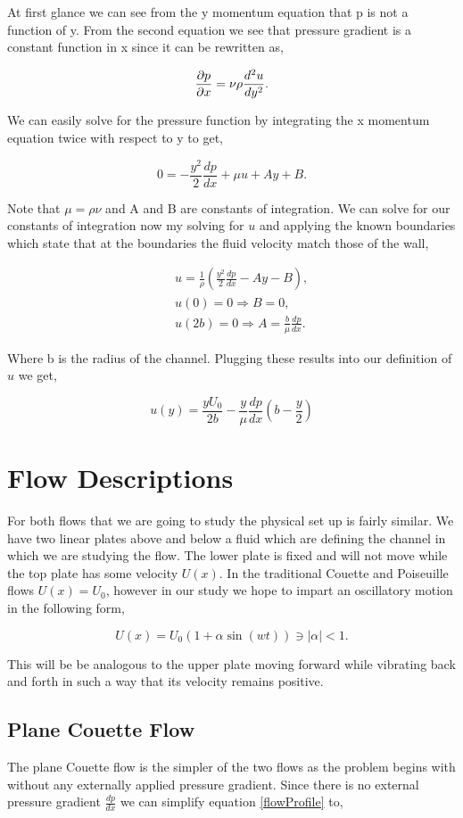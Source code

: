 \documentclass[a4paper,12pt,titlepage]{article}
\begin{document}
At first glance we can see from the y momentum equation that p is not a function of y.  From the second equation we see that pressure gradient is a constant function in x since it can be rewritten as,

\[
\frac{\partial p}{\partial x} = \nu \rho \frac{d^2 u}{dy^2}.
\]

We can easily solve for the pressure function by integrating the x momentum equation twice with respect to y to get,

\[
0 = -\frac{y^2}{2}\frac{dp}{dx} + \mu u + A y + B.
\]

Note that $\mu = \rho \nu$ and A and B are constants of integration.  We can solve for our constants of integration now my solving for $u$ and applying the known boundaries which state that at the boundaries the fluid velocity match those of the wall,

\begin{eqnarray}
&& u = \frac{1}{\rho} \left( \frac{y^2}{2} \frac{dp}{dx} - Ay -B \right),\nonumber \\
&& u(0) = 0 \Rightarrow B = 0, \nonumber \\
&& u(2b) = 0 \Rightarrow A = \frac{b}{\mu} \frac{dp}{dx}.
\end{eqnarray}

Where b is the radius of the channel.  Plugging these results into our definition of $u$ we get,

\[
u(y) = \frac{yU_0}{2b} - \frac{y}{\mu} \frac{dp}{dx}\left(b-\frac{y}{2}\right)
\label{flowProfile}
\]

\section{Flow Descriptions}

For both flows that we are going to study the physical set up is fairly similar.  We have two linear plates above and below a fluid which are defining the channel in which we are studying the flow.  The lower plate is fixed and will not move while the top plate has some velocity $U(x)$.  In the traditional Couette and Poiseuille flows $U(x) = U_0$, however in our study we hope to impart an oscillatory motion in the following form,

\[
U(x) = U_0(1+\alpha \sin(wt)) \ni |\alpha| < 1.
\]

This will be be analogous to the upper plate moving forward while vibrating back and forth in such a way that its velocity remains positive.  

\subsection{Plane Couette Flow}
The plane Couette flow is the simpler of the two flows as the problem begins with without any externally applied pressure gradient.  Since there is no external pressure gradient $\frac{dp}{dx}$ we can simplify equation \ref{flowProfile} to,
\end{document}
